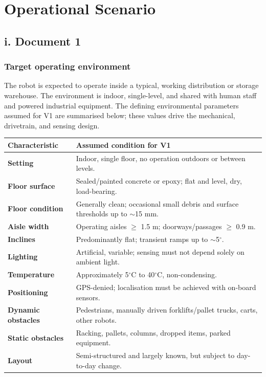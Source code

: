 \chapter{Operational Scenario}

\section*{i. Document 1}

\subsection*{Target operating environment}

The robot is expected to operate inside a typical, working distribution or storage warehouse. The environment is indoor, single-level, and shared with human staff and powered industrial equipment. The defining environmental parameters assumed for V1 are summarised below; these values drive the mechanical, drivetrain, and sensing design.

\begin{table}[H]
\centering
\begin{tabularx}{\textwidth}{>{\bfseries}L{0.28\textwidth}Y}
\toprule
Characteristic & Assumed condition for V1 \\
\midrule
Setting & Indoor, single floor, no operation outdoors or between levels. \\
Floor surface & Sealed/painted concrete or epoxy; flat and level, dry, load-bearing. \\
Floor condition & Generally clean; occasional small debris and surface thresholds up to $\sim$15 mm. \\
Aisle width & Operating aisles $\geq$ 1.5 m; doorways/passages $\geq$ 0.9 m. \\
Inclines & Predominantly flat; transient ramps up to $\sim$5$^\circ$. \\
Lighting & Artificial, variable; sensing must not depend solely on ambient light. \\
Temperature & Approximately 5$^\circ$C to 40$^\circ$C, non-condensing. \\
Positioning & GPS-denied; localisation must be achieved with on-board sensors. \\
Dynamic obstacles & Pedestrians, manually driven forklifts/pallet trucks, carts, other robots. \\
Static obstacles & Racking, pallets, columns, dropped items, parked equipment. \\
Layout & Semi-structured and largely known, but subject to day-to-day change. \\
\bottomrule
\end{tabularx}
\end{table}

